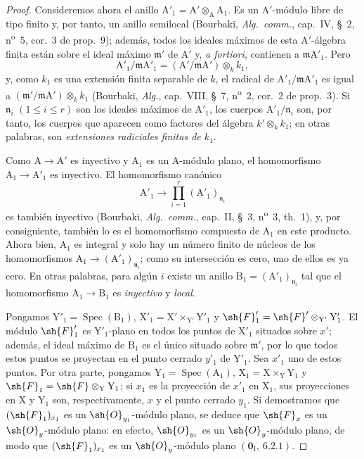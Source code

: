 \begin{proof}
Consideremos ahora el anillo $\mathrm{A}'_1=\mathrm{A}'\otimes_\mathrm{A}\mathrm{A}_1$.
Es un $\mathrm{A}'$-módulo libre de tipo finito y, por tanto, un anillo semilocal (Bourbaki, \emph{Alg.\ comm.}, cap.~IV, \S~2, n\textsuperscript{o}~5, cor.~3 de prop.~9); además, todos los ideales máximos de esta $\mathrm{A}'$-álgebra finita están sobre el ideal máximo $\mathfrak{m}'$ de $\mathrm{A}'$ y, \emph{a fortiori}, contienen a $\mathfrak{m}\mathrm{A}'_1$.
Pero
\[
\mathrm{A}'_1/\mathfrak{m}\mathrm{A}'_1=(\mathrm{A}'/\mathfrak{m}\mathrm{A}')\otimes_k k_1,
\]
y, como $k_1$ es una extensión finita separable de $k$, el radical de $\mathrm{A}'_1/\mathfrak{m}\mathrm{A}'_1$ es igual a $(\mathfrak{m}'/\mathfrak{m}\mathrm{A}')\otimes_k k_1$ (Bourbaki, \emph{Alg.}, cap.~VIII, \S~7, n\textsuperscript{o}~2, cor.~2 de prop.~3).
Si $\mathfrak{n}_i$ $(1\leq i\leq r)$ son los ideales máximos de $\mathrm{A}'_1$, los cuerpos $\mathrm{A}'_1/\mathfrak{n}_i$ son, por tanto, los cuerpos que aparecen como factores del álgebra $k'\otimes_k k_1$; en otras palabras, son \emph{extensiones radiciales finitas de $k_1$}.

Como $\mathrm{A}\to\mathrm{A}'$ es inyectivo y $\mathrm{A}_1$ es un $\mathrm{A}$-módulo plano, el homomorfismo $\mathrm{A}_1\to\mathrm{A}'_1$ es inyectivo.
El homomorfismo canónico
\[
\mathrm{A}'_1\longrightarrow\prod_{i=1}^{r}(\mathrm{A}'_1)_{\mathfrak{n}_i}
\]
es también inyectivo (Bourbaki, \emph{Alg.\ comm.}, cap.~II, \S~3, n\textsuperscript{o}~3, th.~1), y, por consiguiente, también lo es el homomorfismo compuesto de $\mathrm{A}_1$ en este producto.
Ahora bien, $\mathrm{A}_1$ es integral y solo hay un número finito de núcleos de los homomorfismos $\mathrm{A}_1\to(\mathrm{A}'_1)_{\mathfrak{n}_i}$; como su intersección es cero, uno de ellos es ya cero.
En otras palabras, para algún $i$ existe un anillo $\mathrm{B}_1=(\mathrm{A}'_1)_{\mathfrak{n}_i}$ tal que el homomorfismo $\mathrm{A}_1\to\mathrm{B}_1$ es \emph{inyectivo} y \emph{local}.

Pongamos $\mathrm{Y}'_1=\operatorname{Spec}(\mathrm{B}_1)$, $\mathrm{X}'_1=\mathrm{X}'\times_{\mathrm{Y}'}\mathrm{Y}'_1$ y $\sh{F}'_1=\sh{F}'\otimes_{\mathrm{Y}'}\mathrm{Y}'_1$.
El módulo $\sh{F}'_1$ es $\mathrm{Y}'_1$-plano en todos los puntos de $\mathrm{X}'_1$ situados sobre $x'$; además, el ideal máximo de $\mathrm{B}_1$ es el único situado sobre $\mathfrak{m}'$, por lo que todos estos puntos se proyectan en el punto cerrado $y'_1$ de $\mathrm{Y}'_1$.
Sea $x'_1$ uno de estos puntos.
Por otra parte, pongamos $\mathrm{Y}_1=\operatorname{Spec}(\mathrm{A}_1)$, $\mathrm{X}_1=\mathrm{X}\times_\mathrm{Y}\mathrm{Y}_1$ y $\sh{F}_1=\sh{F}\otimes_\mathrm{Y}\mathrm{Y}_1$; si $x_1$ es la proyección de $x'_1$ en $\mathrm{X}_1$, sus proyecciones en $\mathrm{X}$ y $\mathrm{Y}_1$ son, respectivamente, $x$ y el punto cerrado $y_1$.
Si demostramos que $(\sh{F}_1)_{x_1}$ es un $\sh{O}_{y_1}$-módulo plano, se deduce que $\sh{F}_x$ es un $\sh{O}_y$-módulo plano: en efecto, $\sh{O}_{y_1}$ es un $\sh{O}_y$-módulo plano, de modo que $(\sh{F}_1)_{x_1}$ es un $\sh{O}_y$-módulo plano $(\mathbf{0}_\mathrm{I},~6.2.1)$.


\end{proof}
